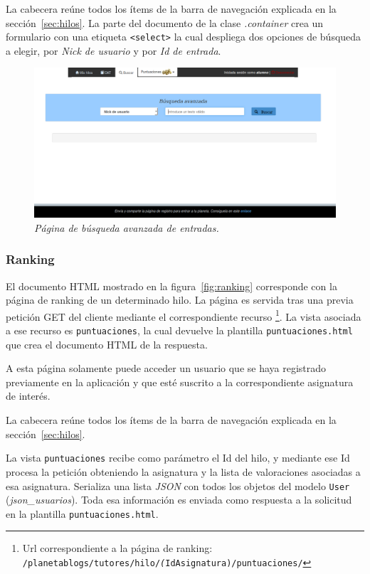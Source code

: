 \documentclass[a4paper, 12pt]{book}
\begin{document}
La cabecera re\'une todos los \'items de la barra de navegaci\'on explicada en la secci\'on~\ref{sec:hilos}. La parte del documento de la clase 
\textit{.container} crea un formulario con una etiqueta \texttt{<select>} la cual despliega dos opciones de b\'usqueda a elegir, por \textit{Nick de usuario} 
y por \textit{Id de entrada}.
\begin{figure}
  \centering
  \includegraphics[width=17cm, keepaspectratio]{imagenes/HiloAlumnoBuscar}
  \caption{\textit{P\'agina de b\'usqueda avanzada de entradas.}}
  \label{fig:buscar}
\end{figure}


\subsubsection{Ranking} 
\label{sec:ranking}
El documento HTML mostrado en la figura~\ref{fig:ranking} corresponde con la p\'agina de ranking de un determinado hilo. 
La p\'agina es servida tras una previa petici\'on GET del cliente mediante el correspondiente recurso \footnote{Url correspondiente a la p\'agina de 
ranking: \texttt{/planetablogs/tutores/hilo/\textit(IdAsignatura)/puntuaciones/}}. La vista asociada a ese recurso es \texttt{puntuaciones}, la cual 
devuelve la plantilla \texttt{puntuaciones.html} que crea el documento HTML de la respuesta.

A esta p\'agina solamente puede acceder un usuario que se haya registrado previamente en la aplicaci\'on y que est\'e suscrito a la
correspondiente asignatura de inter\'es.

La cabecera re\'une todos los \'items de la barra de navegaci\'on explicada en la secci\'on~\ref{sec:hilos}. 

La vista \texttt{puntuaciones} recibe como par\'ametro el Id del hilo, y mediante ese Id procesa la petici\'on obteniendo la asignatura y la lista 
de valoraciones asociadas a esa asignatura. Serializa una lista \textit{JSON} con todos los objetos del modelo \texttt{User} (\textit{json\_usuarios}).
Toda esa informaci\'on es enviada como respuesta a la solicitud en la plantilla \texttt{puntuaciones.html}. 
\end{document}
